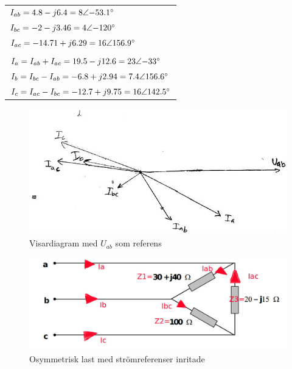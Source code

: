 \documentclass{article}
\begin{document}
  \begin{tabular}{| l}
    $I_{ab}=4.8-j6.4=8\angle{-53.1\degree}$\\
    $I_{bc}=-2-j3.46=4\angle{-120\degree}$\\
    $I_{ac}=-14.71+j6.29=16\angle{156.9\degree}$\\
    \\
    $I_a=I_{ab}+I_{ac}=19.5-j12.6=23\angle{-33\degree}$\\
    $I_b=I_{bc}-I_{ab}=-6.8+j2.94=7.4\angle{156.6\degree}$\\
    $I_c=I_{ac}-I_{bc}=-12.7+j9.75=16\angle{142.5\degree}$\\
  \end{tabular}

 \begin{figure}[H]
  \begin{center}
  \includegraphics[width=1\textwidth]{img/visardb.jpg} %
  \caption{Visardiagram med $U_{ab}$ som referens}
  \label{fig:visarb}
  \end{center}
  \end{figure}




  \begin{figure}[H]
  \begin{center}
  \includegraphics[width=1\textwidth]{img/osymmetrisk-last1.jpg} %
  \caption{Osymmetrisk last med strömreferenser inritade}
  \label{fig:osymm}
  \end{center}
  \end{figure}
\end{document}
